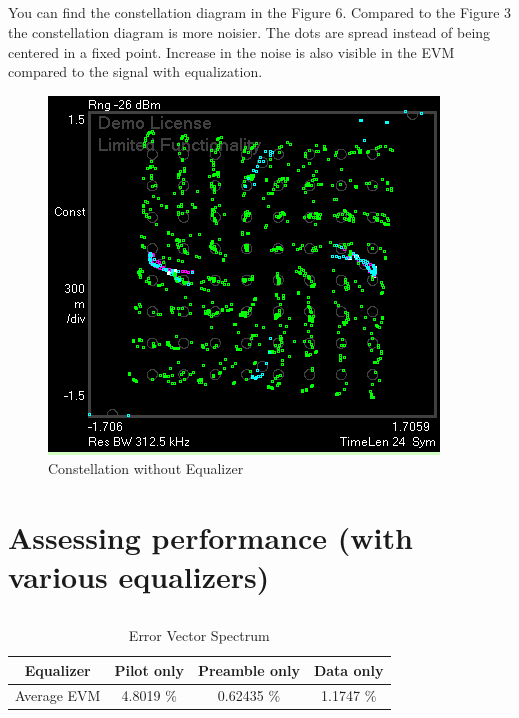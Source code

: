 \documentclass{article}
\begin{document}
\subsection{}
You can find the constellation diagram in the Figure 6. Compared to the Figure 3 the constellation diagram is more noisier. The dots are spread instead of being centered in a fixed point. Increase in the noise is also visible in the EVM compared to the signal with equalization.

\begin{figure}[htb!]
    \centering
    \includegraphics[scale=1]{ofdm-meas-2}
    \caption{Constellation without Equalizer}
\end{figure}

\section{Assessing performance (with various equalizers)}

\subsection{}
\begin{table}[htb!]
    \centering
    \begin{tabular}{|c|c|c|c|}
    \hline
         Equalizer & Pilot only & Preamble only & Data only \\ \hline
         Average EVM & 4.8019 \% & 0.62435 \% & 1.1747 \% \\ \hline
    \end{tabular}
    \caption{Error Vector Spectrum}
\end{table}
\end{document}
